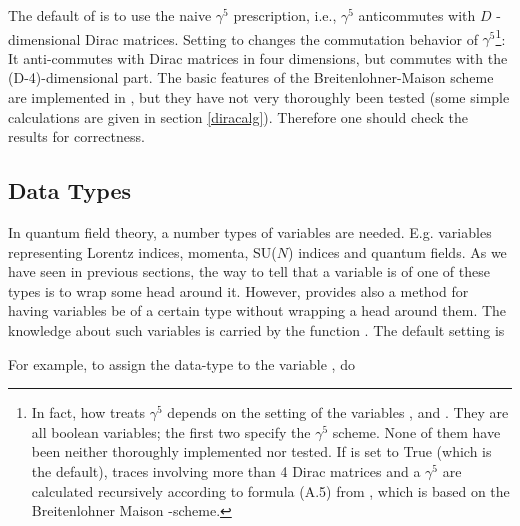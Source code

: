 The default of  \fc is to use the naive $\gamma^{5}$ prescription, i.e.,
$\gamma^{5}$ anticommutes with $D$ - dimensional Dirac matrices.
Setting  to  changes the commutation behavior of 
$\gamma^{5}$\footnote{
In fact, how \fc treats $\gamma^5$ depends on the setting of the variables ,  and . They are all boolean variables; the first two specify the $\gamma^5$ scheme. None of them have been neither thoroughly implemented nor tested. If  is set to True (which is the default), traces involving more than 4 Dirac matrices and a $\gamma^5$ are calculated recursively according to formula (A.5) from \cite{west}, which is based on the Breitenlohner Maison -scheme.
}: It anti-commutes with Dirac matrices in four dimensions, 
but commutes with the (D-4)-dimensional part.
The basic features of the Breitenlohner-Maison scheme are implemented in 
\fc, but they have not very thoroughly been tested (some simple 
calculations are given in  section \ref{diracalg}). 
Therefore one should check the results for correctness.

\subsection{Data Types}
\label{datatypes}

In quantum field theory, a number types of variables are needed. E.g. variables representing Lorentz indices, momenta, SU($N$) indices and quantum fields. As we have seen in previous sections, the way to tell \fc that a variable is of one of these types is to wrap some head around it. However, \fc provides also a method for having variables be of a certain type without wrapping a head around them. The knowledge about such variables is carried by the function . The default setting is


For example, to assign the data-type  to the variable , do



